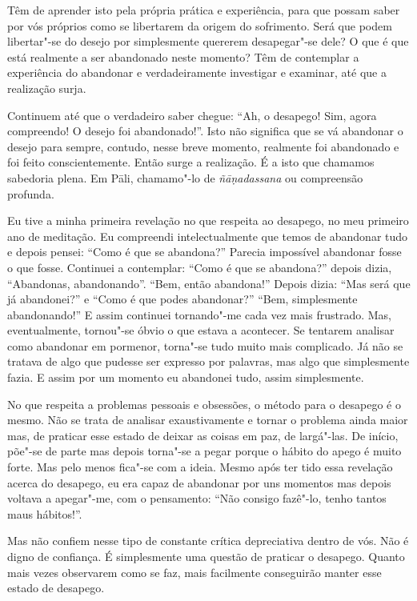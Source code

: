 Têm de aprender isto pela própria prática e experiência, para que possam saber
por vós próprios como se libertarem da origem do sofrimento. Será que podem
libertar"-se do desejo por simplesmente quererem desapegar"-se dele? O que é que
está realmente a ser abandonado neste momento? Têm de contemplar a experiência
do abandonar e verdadeiramente investigar e examinar, até que a realização
surja.

Continuem até que o verdadeiro saber chegue: “Ah, o desapego! Sim, agora
compreendo! O desejo foi abandonado!”. Isto não significa que se vá abandonar o
desejo para sempre, contudo, nesse breve momento, realmente foi abandonado e foi
feito conscientemente. Então surge a realização. É a isto que
chamamos sabedoria plena. Em Pāli, chamamo"-lo de \emph{ñāṇadassana} ou
compreensão profunda.

Eu tive a minha primeira revelação no que respeita ao desapego, no meu primeiro
ano de meditação. Eu compreendi intelectualmente que temos de abandonar tudo e
depois pensei: “Como é que se abandona?” Parecia impossível abandonar fosse o
que fosse. Continuei a contemplar: “Como é que se abandona?” depois dizia,
“Abandonas, abandonando”. “Bem, então abandona!” Depois dizia: “Mas será que já
abandonei?” e “Como é que podes abandonar?” “Bem, simplesmente abandonando!” E
assim continuei tornando"-me cada vez mais frustrado. Mas, eventualmente,
tornou"-se óbvio o que estava a acontecer. Se tentarem analisar como abandonar em
pormenor, torna"-se tudo muito mais complicado. Já não se tratava de algo que
pudesse ser expresso por palavras, mas algo que simplesmente fazia. E assim por
um momento eu abandonei tudo, assim simplesmente.

No que respeita a problemas pessoais e obsessões, o método para o desapego é o
mesmo. Não se trata de analisar exaustivamente e tornar o problema ainda maior
mas, de praticar esse estado de deixar as coisas em paz, de largá"-las. De
início, põe"-se de parte mas depois torna"-se a pegar porque o hábito do apego é
muito forte. Mas pelo menos fica"-se com a ideia. Mesmo após ter tido essa
revelação acerca do desapego, eu era capaz de abandonar por uns momentos mas
depois voltava a apegar"-me, com o pensamento: “Não consigo fazê"-lo, tenho tantos
maus hábitos!”.

Mas não confiem nesse tipo de constante crítica depreciativa dentro de vós. Não
é digno de confiança. É simplesmente uma questão de praticar o desapego. Quanto
mais vezes observarem como se faz, mais facilmente conseguirão manter esse
estado de desapego.

